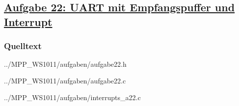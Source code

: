 \subsection
{\href{http://cst.mi.fu-berlin.de/intern/19606-P-MPP/Aufgaben/040703.html}
{Aufgabe 22: UART mit Empfangspuffer und Interrupt}}

\subsubsection*{Quelltext}


{../MPP_WS1011/aufgaben/aufgabe22.h}


{../MPP_WS1011/aufgaben/aufgabe22.c}


{../MPP_WS1011/aufgaben/interrupts_a22.c}
